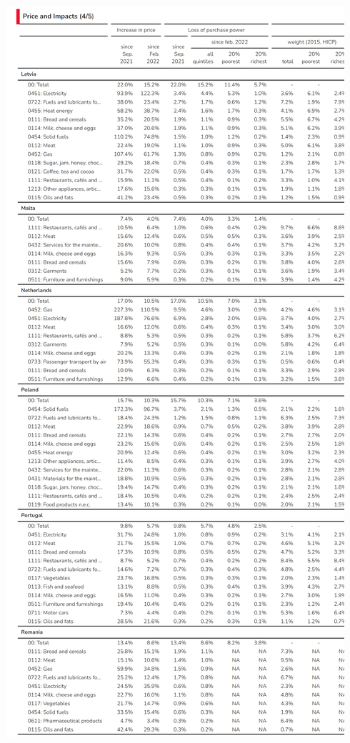 \documentclass[
  9pt,
  a4paper,
  numbers=noendperiod,
  DIV=12]{scrartcl}
\begin{document}
\includegraphics{svg/annex_4.png}
\end{document}
